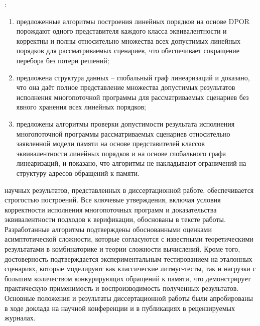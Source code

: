 {}:
\begin{enumerate}[beginpenalty=10000]
  \item предложенные алгоритмы построения линейных порядков на основе
    DPOR порождают одного представителя каждого класса
    эквивалентности и корректны и полны относительно множества всех
    допустимых линейных порядков для рассматриваемых сценариев, что
    обеспечивает сокращение перебора без потери решений;
  \item предложена структура данных -- глобальный граф линеаризаций и
    доказано, что она даёт полное представление множества допустимых
    результатов исполнения многопоточной программы для
    рассматриваемых сценариев без явного хранения всех линейных порядков;
  \item предложены алгоритмы проверки допустимости результата
    исполнения многопоточной программы рассматриваемых сценариев
    относительно заявленной модели памяти на основе представителей
    классов эквивалентности линейных порядков и на основе глобального
    графа линеаризаций, и показано, что алгоритмы не накладывают
    ограничений на структуру адресов обращений к памяти.
\end{enumerate}

{\reliability}
научных результатов, представленных в диссертационной работе, обеспечивается
строгостью построений. Все ключевые утверждения, включая
условия корректности исполнения многопоточных программ и
доказательства эквивалентности подходов к верификации,
обоснованы в тексте работы.
Разработанные алгоритмы подтверждены обоснованными оценками
асимптотической сложности, которые согласуются с известными
теоретическими результатами в комбинаторике и теории сложности вычислений.
Кроме того, достоверность подтверждается экспериментальным
тестированием на эталонных сценариях, которые моделируют как
классические литмус-тесты, так и нагрузки с большим
количеством конкурирующих обращений к памяти, что демонстрирует
практическую применимость и воспроизводимость полученных результатов.
Основные положения и результаты диссертационной работы были
апробированы в ходе доклада на научной конференции и в публикациях в
рецензируемых журналах.

